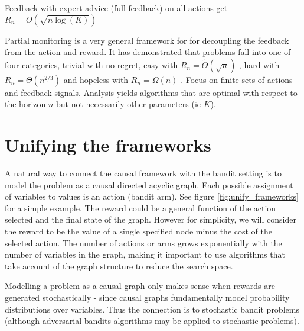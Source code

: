 \documentclass[11pt,a4paper]{article}
\newcommand{\bigtheta}[1]{\Theta\left( #1 \right)}
\newcommand{\bigthetatilde}[1]{\tilde{\Theta}\left( #1 \right)}
\newcommand{\bigomega}[1]{\Omega\left( #1 \right)}
\begin{document}
Feedback with expert advice (full feedback) on all actions get $R_n = O(\sqrt{n\log(K)})$

Partial monitoring is a very general framework for for decoupling the feedback from the action and reward. It has demonstrated that problems fall into one of four categories, trivial with no regret, easy with $R_n = \bigthetatilde{\sqrt{n}}$ , hard with $R_n = \bigtheta{n^{2/3}}$ and hopeless with $R_n = \bigomega{n}$ \cite{Bartok2014}. Focus on finite sets of actions and feedback signals. Analysis yields algorithms that are optimal with respect to the horizon $n$ but not necessarily other parameters (ie $K$). 


\section{Unifying the frameworks}

A natural way to connect the causal framework with the bandit setting is to model the problem as a causal directed acyclic graph. Each possible assignment of variables to values is an action (bandit arm). See figure \ref{fig:unify_frameworks} for a simple example. The reward could be a general function of the action selected and the final state of the graph. However for simplicity, we will consider the reward to be the value of a single specified node minus the cost of the selected action. The number of actions or arms grows exponentially with the number of variables in the graph, making it important to use algorithms that take account of the graph structure to reduce the search space. 

Modelling a problem as a causal graph only makes sense when rewards are generated stochastically - since causal graphs fundamentally model probability distributions over variables. Thus the connection is to stochastic bandit problems (although adversarial bandits algorithms may be applied to stochastic problems). 
\end{document}
